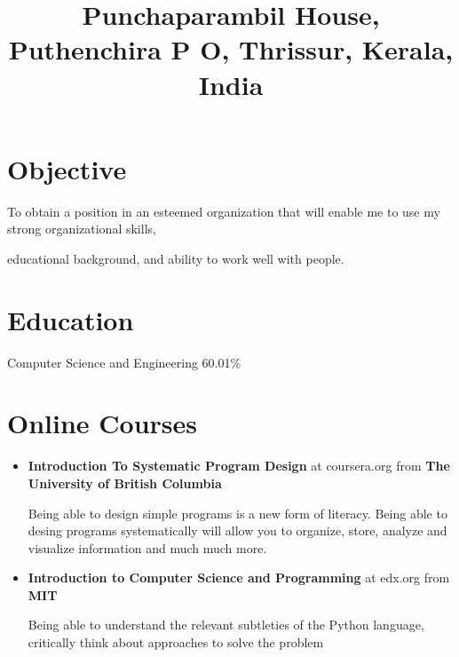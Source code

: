 \documentclass[11pt,a4paper]{moderncv}
\title{\footnotesize Punchaparambil House, Puthenchira P O, Thrissur, Kerala, India}
\begin{document}
\maketitle



\section{Objective}

To obtain a position in an esteemed organization that will enable me to use my strong organizational skills, 

educational background, and ability to work well with people.


\section{Education}
                {Computer Science and Engineering 60.01\%}{}{}


\section{Online Courses}
\begin{itemize}
    \item{\textbf{Introduction To Systematic Program Design} at coursera.org from \textbf{The University of British Columbia}}


Being able to design simple programs is a new form of literacy. Being able to desing programs systematically will allow you
to organize, store, analyze and visualize information and much much more.


\textcolor{gray}{}
    \item{\textbf{Introduction to Computer Science and Programming} at edx.org from \textbf{MIT}}
    
    
Being able to understand the relevant subtleties of the Python language, critically think about approaches to solve the 
problem

    
\textcolor{gray}{}
\end{itemize}
\end{document}
